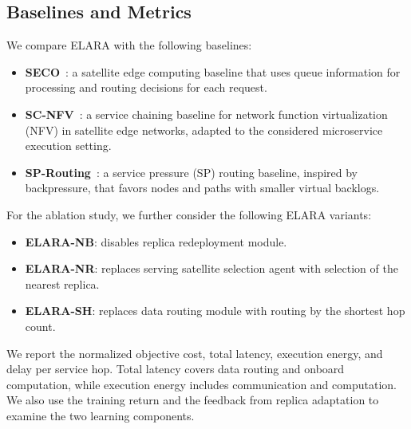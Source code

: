 \documentclass[10pt, conference, letterpaper]{IEEEtran}
\begin{document}
\subsection{Baselines and Metrics}
We compare ELARA with the following baselines:
\begin{itemize}
\item \textbf{SECO}~\cite{seco_infocom2024}: a satellite edge computing baseline that uses queue information for processing and routing decisions for each request.
\item \textbf{SC-NFV}~\cite{sc_nfv_tmc2024}: a service chaining baseline for network function virtualization (NFV) in satellite edge networks, adapted to the considered microservice execution setting.
\item \textbf{SP-Routing}~\cite{service_pressure}: a service pressure (SP) routing baseline, inspired by backpressure, that favors nodes and paths with smaller virtual backlogs.
\end{itemize}

For the ablation study, we further consider the following ELARA variants:
\begin{itemize}
\item \textbf{ELARA-NB}: disables replica redeployment module.
\item \textbf{ELARA-NR}: replaces serving satellite selection agent with selection of the nearest replica.
\item \textbf{ELARA-SH}: replaces data routing module with routing by the shortest hop count.
\end{itemize}


We report the normalized objective cost, total latency, execution energy, and delay per service hop. Total latency covers data routing and onboard computation, while execution energy includes communication and computation. We also use the training return and the feedback from replica adaptation to examine the two learning components.
\end{document}
